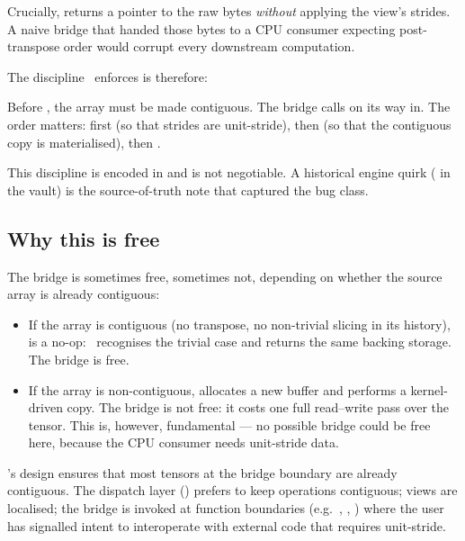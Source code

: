 Crucially,  returns a pointer to
the raw bytes \emph{without} applying the view's strides. A naive
bridge that handed those bytes to a CPU consumer expecting
post-transpose order would corrupt every downstream computation.

The discipline \Lucid\ enforces is therefore:

\begin{lucidwarn}
Before , the array must be made
contiguous. The bridge calls 
on its way in. The order matters:  first (so that
strides are unit-stride), then  (so that the contiguous
copy is materialised), then .
\end{lucidwarn}

This discipline is encoded in  and is
not negotiable. A historical engine quirk
( in the vault) is the
source-of-truth note that captured the bug class.

\subsection{Why this is free}
\label{ssec:unified_memory:bridge_free}

The bridge is sometimes free, sometimes not, depending on whether
the source array is already contiguous:

\begin{itemize}
  \item If the array is contiguous (no transpose, no non-trivial
    slicing in its history),  is a no-op: \MLX\
    recognises the trivial case and returns the same backing
    storage. The bridge is free.
  \item If the array is non-contiguous,  allocates
    a new buffer and performs a kernel-driven copy. The bridge is
    not free: it costs one full read--write pass over the tensor.
    This is, however, fundamental --- no possible bridge could be
    free here, because the CPU consumer needs unit-stride data.
\end{itemize}

\Lucid's design ensures that most tensors at the bridge boundary are
already contiguous. The dispatch layer (\chref{ch:backend_dispatch})
prefers to keep operations contiguous; views are localised; the
bridge is invoked at function boundaries (e.g.\ ,
\code{.tolist()}, \code{\_\_dlpack\_\_}) where the user has signalled
intent to interoperate with external code that requires unit-stride.

